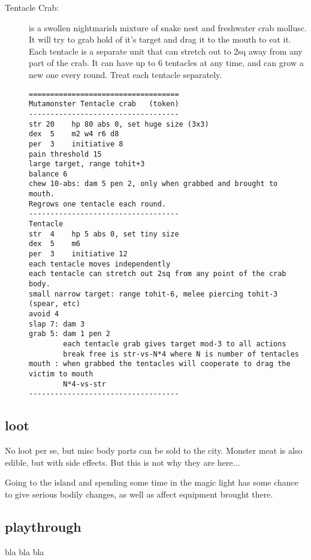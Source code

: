 \begin{description}
\item[Tentacle Crab:] is a swollen nightmarish mixture of snake nest and freshwater crab mollusc. It will try to grab hold of it's target and drag it to the mouth to eat it. Each tentacle is a separate unit that can stretch out to 2sq away from any part of the crab. It can have up to 6 tentacles at any time, and can grow a new one every round. Treat each tentacle separately.
\goodbreak \begin{samepage} \small \begin{verbatim}
===================================
Mutamonster Tentacle crab   (token)
-----------------------------------
str 20    hp 80 abs 0, set huge size (3x3)
dex  5    m2 w4 r6 d8
per  3    initiative 8
pain threshold 15
large target, range tohit+3
balance 6
chew 10-abs: dam 5 pen 2, only when grabbed and brought to mouth.
Regrows one tentacle each round.
-----------------------------------
Tentacle
str  4    hp 5 abs 0, set tiny size
dex  5    m6
per  3    initiative 12
each tentacle moves independently
each tentacle can stretch out 2sq from any point of the crab body.
small narrow target: range tohit-6, melee piercing tohit-3 (spear, etc)
avoid 4
slap 7: dam 3
grab 5: dam 1 pen 2
        each tentacle grab gives target mod-3 to all actions
        break free is str-vs-N*4 where N is number of tentacles
mouth : when grabbed the tentacles will cooperate to drag the victim to mouth
        N*4-vs-str
-----------------------------------
\end{verbatim} \normalsize \end{samepage}

\end{description}


\subsection*{loot}

No loot per se, but misc body parts can be sold to the city. Monster meat is also edible, but with side effects. But this is not why they are here...

Going to the island and spending some time in the magic light has some chance to give serious bodily changes, as well as affect equipment brought there.


\subsection*{playthrough}

bla bla bla







